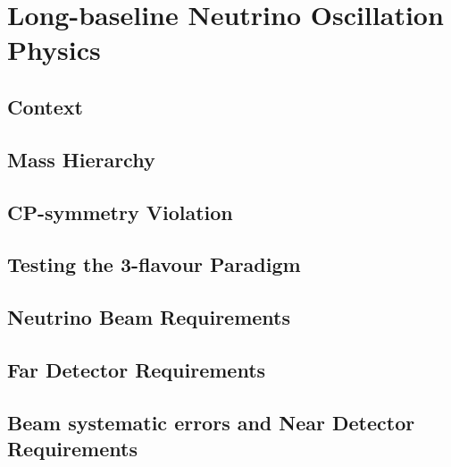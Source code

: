 \chapter{Long-baseline Neutrino Oscillation Physics}
\label{ch:physics-lbnosc}

\section{Context}
\label{sec:physics-lbnosc-context}

\section{Mass Hierarchy}
\label{sec:physics-lbnosc-mh}

\section{CP-symmetry Violation}
\label{sec:physics-lbnosc-cpv}

\section{Testing the 3-flavour Paradigm}
\label{sec:physics-lbnosc-3nutests}

\section{Neutrino Beam Requirements}
\label{sec:physics-lbnosc-beam-req}

\section{Far Detector Requirements}
\label{sec:physics-lbnosc-fd-req}

\section{Beam systematic errors and Near Detector Requirements}
\label{sec:physics-lbnosc-beamnd-req}
